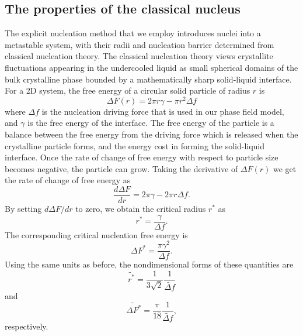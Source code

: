 \documentclass[preprint,12pt]{elsarticle}
\begin{document}
\subsection{The properties of the classical nucleus}
The explicit nucleation method that we employ introduces nuclei into a metastable system, with their radii and nucleation barrier determined from classical nucleation theory. %
The classical nucleation theory views crystallite fluctuations appearing in the undercooled liquid as small spherical domains of the bulk crystalline phase bounded by a mathematically sharp solid-liquid interface. For a 2D system, the free energy of a circular solid particle of radius $r$ is 
\begin{equation}
    \Delta F(r) = 2 \pi r \gamma - \pi r^2 \Delta f
    \label{eqn:deltaG}
\end{equation}
where $\Delta f$ is the nucleation driving force that is used in our phase field model, and $\gamma$ is the free energy of the interface. The free energy of the particle is a balance between the free energy from the driving force which is released when the crystalline particle forms, and the energy cost in forming the solid-liquid interface. Once the rate of change of free energy with respect to particle size becomes negative, the particle can grow. Taking the derivative of $\Delta F(r)$ we get the rate of change of free energy as
\begin{equation}
    \frac{d\Delta F}{dr}=2\pi \gamma - 2\pi r\Delta f.
    \label{eqn:ddeltaGdr}
\end{equation}
By setting $d\Delta F/dr$ to zero, we obtain the critical radius $r^*$ as
\begin{equation}
    r^* = \frac{\gamma}{\Delta f}.
    \label{eqn:rc}
\end{equation}
The corresponding critical nucleation free energy is
\begin{equation}
    \Delta F^* = \frac{\pi \gamma^2}{\Delta f}.
    \label{eqn:deltaGc}
\end{equation}
Using the same units as before, the nondimensional forms of these quantities are
\begin{equation}
    \widetilde{r^*} = \frac{1}{3\sqrt{2}}\frac{1}{\widetilde{\Delta f}}
    \label{eqn:trc}
\end{equation}
and
\begin{equation}
    \widetilde{\Delta F^*} = \frac{\pi}{18}\frac{1}{\widetilde{\Delta f}}
    \label{eqn:tdeltaGc},
\end{equation}
respectively.
\end{document}

